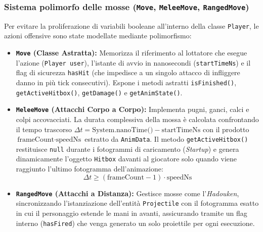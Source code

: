 \documentclass[11pt, a4paper]{article}
\begin{document}
	\subsubsection{Sistema polimorfo delle mosse (\texttt{Move}, \texttt{MeleeMove}, \texttt{RangedMove})}
	Per evitare la proliferazione di variabili booleane all'interno della classe \texttt{Player}, le azioni offensive sono state modellate mediante polimorfismo:
	\begin{itemize}
		\item \textbf{\texttt{Move} (Classe Astratta):} Memorizza il riferimento al lottatore che esegue l'azione (\texttt{Player user}), l'istante di avvio in nanosecondi (\texttt{startTimeNs}) e il flag di sicurezza \texttt{hasHit} (che impedisce a un singolo attacco di infliggere danno in più tick consecutivi). Espone i metodi astratti \texttt{isFinished()}, \texttt{getActiveHitbox()}, \texttt{getDamage()} e \texttt{getAnimState()}.
		\item \textbf{\texttt{MeleeMove} (Attacchi Corpo a Corpo):} Implementa pugni, ganci, calci e colpi accovacciati. La durata complessiva della mossa è calcolata confrontando il tempo trascorso $\Delta t = \text{System.nanoTime()} - \text{startTimeNs}$ con il prodotto $\text{frameCount} \cdot \text{speedNs}$ estratto da \texttt{AnimData}. Il metodo \texttt{getActiveHitbox()} restituisce \texttt{null} durante i fotogrammi di caricamento (\emph{Startup}) e genera dinamicamente l'oggetto \texttt{Hitbox} davanti al giocatore solo quando viene raggiunto l'ultimo fotogramma dell'animazione:
		\begin{equation}
			\Delta t \ge (\text{frameCount} - 1) \cdot \text{speedNs}
		\end{equation}
		\item \textbf{\texttt{RangedMove} (Attacchi a Distanza):} Gestisce mosse come l'\emph{Hadouken}, sincronizzando l'istanziazione dell'entità \texttt{Projectile} con il fotogramma esatto in cui il personaggio estende le mani in avanti, assicurando tramite un flag interno (\texttt{hasFired}) che venga generato un solo proiettile per ogni esecuzione.
	\end{itemize}
	
\end{document}

